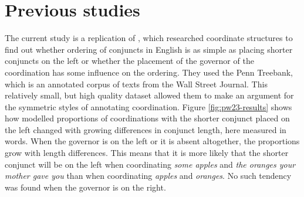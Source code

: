\section{Previous studies}\label{sec:previous}
The current study is a replication of \cite{prz:woz:23}, which researched coordinate structures to find out whether ordering of conjuncts in English is as simple as placing shorter conjuncts on the left or whether the placement of the governor of the coordination has some influence on the ordering. They used the Penn Treebank, which is an annotated corpus of texts from the Wall Street Journal. This relatively small, but high quality dataset allowed them to make an argument for the symmetric styles of annotating coordination. Figure \ref{fig:pw23-results} shows how modelled proportions of coordinations with the shorter conjunct placed on the left changed with growing differences in conjunct length, here measured in words. When the governor is on the left or it is absent altogether, the proportions grow with length differences. This means that it is more likely that the shorter conjunct will be on the left when coordinating \textsl{some apples} and \textsl{the oranges your mother gave you} than when coordinating \textsl{apples} and \textsl{oranges}. No such tendency was found when the governor is on the right. 

